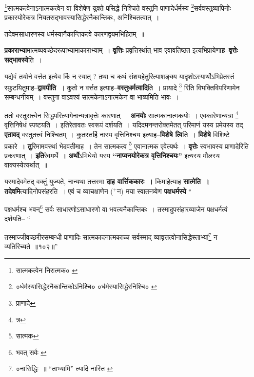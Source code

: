 \documentclass[article,12pt,a4paper]{memoir}
\newcommand{\add}[1]{($^{+}$#1)}
\begin{document}
	  \endgroup
	 

	  \pstart \footnote{सात्मकत्वेन निरात्मक० \cite{dp-msD}}\-सात्मकत्वेनाऽनात्मकत्वेन वा विशेषेण युक्ते प्रसिद्धे निश्चिते वस्तुनि प्राणादेर्धर्मस्य \footnote{०र्धर्मस्यासिद्धेरनैकान्तिकोऽनिश्चि० \cite{dp-msA} \cite{dp-msB} \cite{dp-edP} \cite{dp-edH} \cite{dp-edE} \cite{dp-edN} ०र्धर्मस्यासिद्धेरनिश्चि० \cite{dp-msC}}\-सर्ववस्तुव्यापिनोः प्रकारयोरेकत्र नियतसद्भावस्यासिद्धेरनैकान्तिकः, अनिश्चितत्वात् ।
	\pend
       

	  \pstart तदेवमसाधारणस्य धर्मस्यानैकान्तिकत्वे कारणद्वयमभिहितम् ॥
	\pend
      
	  \endgroup
	

	  \pstart \textbf{प्रकाराभ्या}मात्मव्यवच्छेदरूपाभ्यामाकाराभ्याम् । \textbf{वृत्तिः} प्रवृत्तिरर्थात् भाव एवावतिष्ठत इत्यभिप्रायेणा\textbf{ह--वृत्तेः सद्भावस्ये}ति ।
	\pend
      

	  \pstart यद्येवं तयोर्न वर्त्तत इत्येव किं न स्यात् ? तथा च कथं संशयहेतुरित्याशङ्क्य यादृशोऽस्यार्थोऽभिप्रेतस्तं स्फुटयितुमाह--\textbf{द्वावपीति ।} कुतो न वर्त्तत इत्याह--\textbf{वस्तुधर्मत्वादि}ति । प्रायादे \footnote{प्राणादे} रिति विभक्तिविपरिणामेन सम्बन्धनीयम् । वस्तुना वाऽवश्यं सात्मकेनाऽनात्मकेन वा भाव्यमिति भावः ।
	\pend
      

	  \pstart ततो वस्तुसत्त्वेन सिद्धपरित्यागेनान्यत्रावृत्तेः कारणात् । \textbf{अनयोः} सात्मकानात्मकयोः । एवकारेणान्यत्रा \footnote{त्र} वृत्तिनिषेधं स्पष्टयति । इतिरेतावतः स्वरूपं दर्शयति । यदिदमनन्तरोक्तमेतत् परिमाणं यस्य प्रमेयस्य तद् \textbf{एतावद्} वस्तुतत्त्वं निश्चितम् । कुतस्तर्हि नास्य वृत्तिनिश्चय इत्याह--\textbf{विशेषे त्वि}ति । \textbf{विशेषे} विशिष्टे प्रकारे । \textbf{तु}रिमामवस्थां भेदवतीमाह । तेन सात्मकत्व \footnote{सात्मक} एवानात्मक एवेत्यर्थः । \textbf{वृत्तेः} स्वभावस्य प्राणादेरिति प्रकरणात् । \textbf{इति}रेवमर्थे । \textbf{अर्थो}ऽभिधेयो यस्य \textbf{“नाप्यनयोरेकत्र वृत्तिनिश्चयः”} इत्यस्य मौलस्य वाक्यस्येत्यर्थात् ॥
	\pend
      

	  \pstart यस्मादेवमेतद् वक्तुं युज्यते, नान्यथा तत्तस्मा \leavevmode{} \textbf{दाह वार्त्तिककारः ।} किमाहेत्याह \textbf{सात्मेति । तदेवमि}त्यादिनोपसंहरति । एवं च व्याचक्षाणेन \add{न} मया स्वातन्त्र्येण \textbf{पक्षधर्मस्ये}  \leavevmode{} “
	  
	पक्षधर्मश्च भवन्\footnote{भवत् सर्वः \cite{dp-msA}} सर्वः साधारणोऽसाधारणो वा भवत्यनैकान्तिकः । तस्मादुपसंहारव्याजेन पक्षधर्मत्वं दर्शयति-- “
	  
	तस्माज्जीवच्छरीरसम्बन्धी प्राणादिः सात्मकादनात्मकाच्च सर्वस्माद् व्यावृत्तत्वोनासिद्धेस्ताभ्यां\footnote{०नासिद्धिः ॥ \cite{dp-edE} “ताभ्यामि” त्यादि नास्ति \cite{dp-edE}} न व्यतिरिच्यते ॥१०२॥” 
	  
\end{document}
